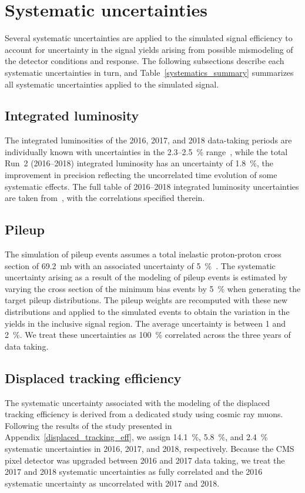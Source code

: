\section{Systematic uncertainties}
\label{systematics}
Several systematic uncertainties are applied to the simulated signal efficiency to account for uncertainty in the signal yields arising from possible mismodeling of the detector conditions and response. The following subsections describe each systematic uncertainties in turn, and Table~\ref{systematics_summary} summarizes all systematic uncertainties applied to the simulated signal.



\subsection{Integrated luminosity}
The integrated luminosities of the 2016, 2017, and 2018 data-taking periods are individually known with uncertainties in the 2.3--\SI{2.5}{\percent} range~\cite{CMS:lumi2016,CMS:lumi2017,CMS:lumi2018}, while the total Run~2 (2016--2018) integrated luminosity has an uncertainty of \SI{1.8}{\percent}, the improvement in precision reflecting the uncorrelated time evolution of some systematic effects. The full table of 2016--2018 integrated luminosity uncertainties are taken from~\cite{lumiTwiki}, with the correlations specified therein.

\subsection{Pileup}
The simulation of pileup events assumes a total inelastic proton-proton cross section of \SI{69.2}{\milli\barn} with an associated uncertainty of \SI{5}{\percent}~\cite{Sirunyan:2018nqx}. The systematic uncertainty arising as a result of the modeling of pileup events is estimated by varying the cross section of the minimum bias events by \SI{5}{\percent} when generating the target pileup distributions. The pileup weights are recomputed with these new distributions and applied to the simulated events to obtain the variation in the yields in the inclusive signal region. The average uncertainty is between 1 and \SI{2}{\percent}. We treat these uncertainties as \SI{100}{\percent} correlated across the three years of data taking.

\subsection{Displaced tracking efficiency}
The systematic uncertainty associated with the modeling of the displaced tracking efficiency is derived from a dedicated study using cosmic ray muons. Following the results of the study presented in Appendix~\ref{displaced_tracking_eff}, we assign \SI{14.1}{\percent}, \SI{5.8}{\percent}, and \SI{2.4}{\percent} systematic uncertainties in 2016, 2017, and 2018, respectively. Because the CMS pixel detector was upgraded between 2016 and 2017 data taking, we treat the 2017 and 2018 systematic uncertainties as fully correlated and the 2016 systematic uncertainty as uncorrelated with 2017 and 2018.

